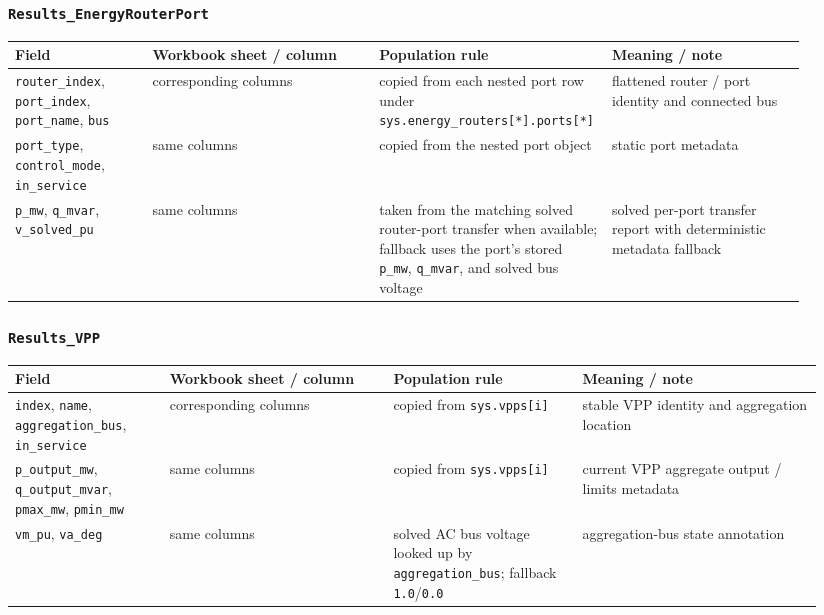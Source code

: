\subsubsection*{\texttt{Results\_EnergyRouterPort}}

\begin{longtable}{@{}L{0.17\linewidth}L{0.29\linewidth}L{0.22\linewidth}L{0.24\linewidth}@{}}
\toprule
Field & Workbook sheet / column & Population rule & Meaning / note \\
\midrule
\endhead
\texttt{router\_index}, \texttt{port\_index}, \texttt{port\_name}, \texttt{bus} & corresponding columns & copied from each nested port row under \texttt{sys.energy\_routers[*].ports[*]} & flattened router / port identity and connected bus \\
\texttt{port\_type}, \texttt{control\_mode}, \texttt{in\_service} & same columns & copied from the nested port object & static port metadata \\
\texttt{p\_mw}, \texttt{q\_mvar}, \texttt{v\_solved\_pu} & same columns & taken from the matching solved router-port transfer when available; fallback uses the port's stored \texttt{p\_mw}, \texttt{q\_mvar}, and solved bus voltage & solved per-port transfer report with deterministic metadata fallback \\
\bottomrule
\end{longtable}

\subsubsection*{\texttt{Results\_VPP}}

\begin{longtable}{@{}L{0.18\linewidth}L{0.26\linewidth}L{0.22\linewidth}L{0.28\linewidth}@{}}
\toprule
Field & Workbook sheet / column & Population rule & Meaning / note \\
\midrule
\endhead
\texttt{index}, \texttt{name}, \texttt{aggregation\_bus}, \texttt{in\_service} & corresponding columns & copied from \texttt{sys.vpps[i]} & stable VPP identity and aggregation location \\
\texttt{p\_output\_mw}, \texttt{q\_output\_mvar}, \texttt{pmax\_mw}, \texttt{pmin\_mw} & same columns & copied from \texttt{sys.vpps[i]} & current VPP aggregate output / limits metadata \\
\texttt{vm\_pu}, \texttt{va\_deg} & same columns & solved AC bus voltage looked up by \texttt{aggregation\_bus}; fallback \texttt{1.0}/\texttt{0.0} & aggregation-bus state annotation \\
\bottomrule
\end{longtable}

